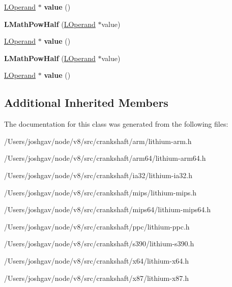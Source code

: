 \begin{DoxyCompactItemize}
\item 
\hyperlink{classv8_1_1internal_1_1_l_operand}{L\+Operand} $\ast$ {\bfseries value} ()\hypertarget{classv8_1_1internal_1_1_l_math_pow_half_abff5afb55737981b1909cd410b3bc143}{}\label{classv8_1_1internal_1_1_l_math_pow_half_abff5afb55737981b1909cd410b3bc143}

\item 
{\bfseries L\+Math\+Pow\+Half} (\hyperlink{classv8_1_1internal_1_1_l_operand}{L\+Operand} $\ast$value)\hypertarget{classv8_1_1internal_1_1_l_math_pow_half_acbe1014cc8f24baf88612cfd54b39791}{}\label{classv8_1_1internal_1_1_l_math_pow_half_acbe1014cc8f24baf88612cfd54b39791}

\item 
\hyperlink{classv8_1_1internal_1_1_l_operand}{L\+Operand} $\ast$ {\bfseries value} ()\hypertarget{classv8_1_1internal_1_1_l_math_pow_half_abff5afb55737981b1909cd410b3bc143}{}\label{classv8_1_1internal_1_1_l_math_pow_half_abff5afb55737981b1909cd410b3bc143}

\item 
{\bfseries L\+Math\+Pow\+Half} (\hyperlink{classv8_1_1internal_1_1_l_operand}{L\+Operand} $\ast$value)\hypertarget{classv8_1_1internal_1_1_l_math_pow_half_acbe1014cc8f24baf88612cfd54b39791}{}\label{classv8_1_1internal_1_1_l_math_pow_half_acbe1014cc8f24baf88612cfd54b39791}

\item 
\hyperlink{classv8_1_1internal_1_1_l_operand}{L\+Operand} $\ast$ {\bfseries value} ()\hypertarget{classv8_1_1internal_1_1_l_math_pow_half_abff5afb55737981b1909cd410b3bc143}{}\label{classv8_1_1internal_1_1_l_math_pow_half_abff5afb55737981b1909cd410b3bc143}

\end{DoxyCompactItemize}
\subsection*{Additional Inherited Members}


The documentation for this class was generated from the following files\+:\begin{DoxyCompactItemize}
\item 
/\+Users/joshgav/node/v8/src/crankshaft/arm/lithium-\/arm.\+h\item 
/\+Users/joshgav/node/v8/src/crankshaft/arm64/lithium-\/arm64.\+h\item 
/\+Users/joshgav/node/v8/src/crankshaft/ia32/lithium-\/ia32.\+h\item 
/\+Users/joshgav/node/v8/src/crankshaft/mips/lithium-\/mips.\+h\item 
/\+Users/joshgav/node/v8/src/crankshaft/mips64/lithium-\/mips64.\+h\item 
/\+Users/joshgav/node/v8/src/crankshaft/ppc/lithium-\/ppc.\+h\item 
/\+Users/joshgav/node/v8/src/crankshaft/s390/lithium-\/s390.\+h\item 
/\+Users/joshgav/node/v8/src/crankshaft/x64/lithium-\/x64.\+h\item 
/\+Users/joshgav/node/v8/src/crankshaft/x87/lithium-\/x87.\+h\end{DoxyCompactItemize}
